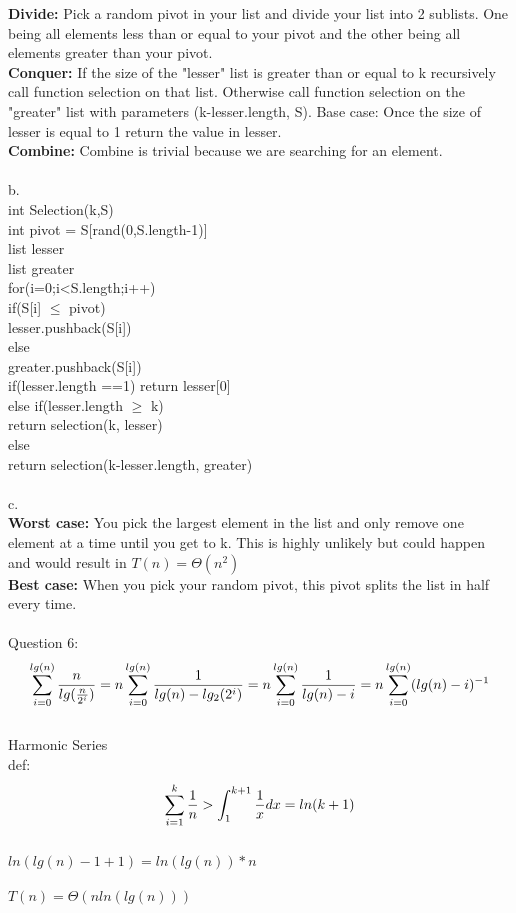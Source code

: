 \documentclass[12pt]{article}
\newcommand\tab[1][1cm]{\hspace*{#1}}
\begin{document}
\tab\tab \textbf{Divide:} Pick a random pivot in your list and divide your list into 2 sublists. One being all elements less than or equal to your pivot and the other being all elements greater than your pivot.\\
\tab\tab \textbf{Conquer:} If the size of the "lesser" list is greater than or equal to k recursively call function selection on that list. Otherwise call function selection on the "greater" list with parameters (k-lesser.length, S). Base case: Once the size of lesser is equal to 1 return the value in lesser.\\
\tab\tab \textbf{Combine:} Combine is trivial because we are searching for an element.\\\\
\tab\tab b.\\
\tab\tab int Selection(k,S)\\
\tab\tab\tab int pivot = S[rand(0,S.length-1)]\\
\tab\tab\tab list lesser\\
\tab\tab\tab list greater\\
\tab\tab\tab for(i=0;i<S.length;i++)\\
\tab\tab\tab\tab if(S[i] $\leq$ pivot) \\
\tab\tab\tab\tab\tab lesser.pushback(S[i])\\
\tab\tab\tab\tab else\\
\tab\tab\tab\tab\tab greater.pushback(S[i])\\
\tab\tab\tab if(lesser.length ==1) return lesser[0]\\
\tab\tab\tab else if(lesser.length $\ge$ k)\\
\tab\tab\tab\tab return selection(k, lesser)\\
\tab\tab\tab else\\
\tab\tab\tab \tab return selection(k-lesser.length, greater)\\\\
\tab\tab c.\\
\tab\tab \textbf{Worst case:} You pick the largest element in the list and only remove one element at a time until you get to k. This is highly unlikely but could happen and would result in $T(n) = \Theta(n^2)$\\
\tab\tab \textbf{Best case:} When you pick your random pivot, this pivot splits the list in half every time.\\\\
Question 6:\\
\vspace{100mm}
\vfill 
$$\sum_{i=0}^{lg(n)} {n\over lg({n\over2^i})} = n\sum_{i=0}^{lg(n)} {1\over lg({n})-lg_2(2^i)} = n\sum_{i=0}^{lg(n)} {1\over lg({n})-i}= n\sum_{i=0}^{lg(n)} ({lg({n})-i})^{-1}$$\\
\tab\tab Harmonic Series\\
\tab\tab def: $$\sum_{i=1}^{k}{1\over n} >  \int_{1}^{k+1} {1\over x} dx = ln(k+1)$$\\
\tab\tab  $ln(lg(n)-1+1) = ln(lg(n))*n$\\\\
\tab\tab $T(n) = \Theta(n ln(lg(n)))$\\
\end{document}
